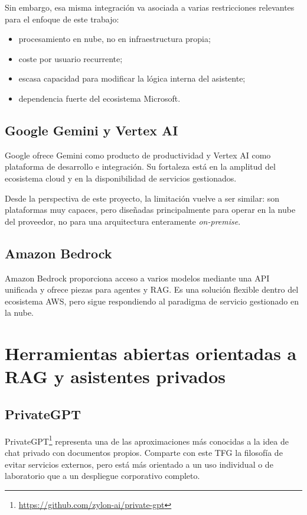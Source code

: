 Sin embargo, esa misma integración va asociada a varias restricciones relevantes para el enfoque de este trabajo:

\begin{itemize}
    \item procesamiento en nube, no en infraestructura propia;
    \item coste por usuario recurrente;
    \item escasa capacidad para modificar la lógica interna del asistente;
    \item dependencia fuerte del ecosistema Microsoft.
\end{itemize}

\subsection{Google Gemini y Vertex AI}

Google ofrece Gemini como producto de productividad y Vertex AI como plataforma de desarrollo e integración. Su fortaleza está en la amplitud del ecosistema cloud y en la disponibilidad de servicios gestionados.

Desde la perspectiva de este proyecto, la limitación vuelve a ser similar: son plataformas muy capaces, pero diseñadas principalmente para operar en la nube del proveedor, no para una arquitectura enteramente \textit{on-premise}.

\subsection{Amazon Bedrock}

Amazon Bedrock proporciona acceso a varios modelos mediante una API unificada y ofrece piezas para agentes y RAG. Es una solución flexible dentro del ecosistema AWS, pero sigue respondiendo al paradigma de servicio gestionado en la nube.

\section{Herramientas abiertas orientadas a RAG y asistentes privados}

\subsection{PrivateGPT}

PrivateGPT\footnote{\url{https://github.com/zylon-ai/private-gpt}} representa una de las aproximaciones más conocidas a la idea de chat privado con documentos propios. Comparte con este TFG la filosofía de evitar servicios externos, pero está más orientado a un uso individual o de laboratorio que a un despliegue corporativo completo.

